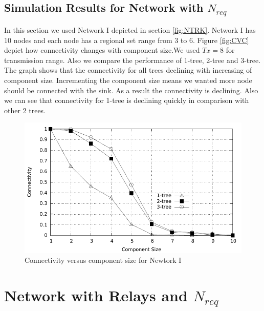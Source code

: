 \documentclass[12pt]{article}
\begin{document}
\subsection{Simulation Results for Network with $N_{req}$}
In this section we used Network I depicted in section \ref{fig:NTRK}. Network I has 10 nodes and each node has a regional set range from 3 to 6. Figure \ref{fig:CVC} depict how connectivity changes with component size.We used $Tx=8$ for transmission range. Also we compare the performance of 1-tree, 2-tree and 3-tree. The graph shows that the connectivity for all trees declining with increasing of component size. Incrementing the component size means we wanted more node should be connected with the sink. As a result the connectivity is declining.  Also we can see that connectivity for 1-tree is declining quickly in comparison with other 2 trees.
\begin{figure}
\begin{minipage}{.9\linewidth}
\includegraphics[width=6 in, height=2.8 in]{ConVsCom_woR.pdf}
\caption{Connectivity versus component size for Newtork I }
\label{Fig:CVC}
\end{minipage}
\end{figure}

\section{Network with Relays and $N_{req}$}
\end{document}
